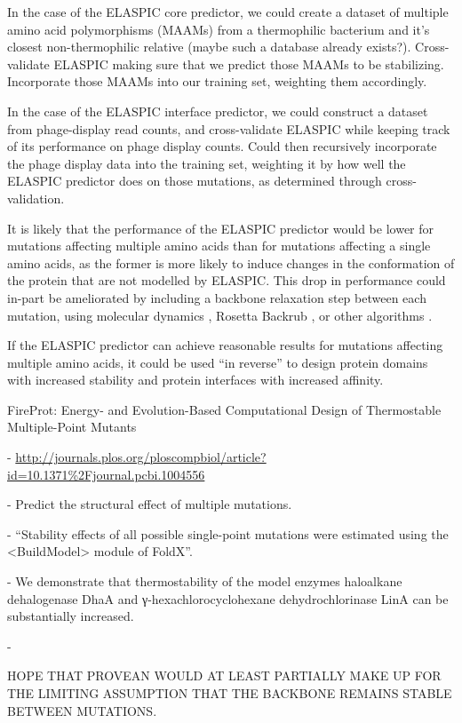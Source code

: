 In the case of the ELASPIC core predictor, we could create a dataset of multiple amino acid polymorphisms (MAAMs) from a thermophilic bacterium and it's closest non-thermophilic relative (maybe such a database already exists?). Cross-validate ELASPIC making sure that we predict those MAAMs to be stabilizing. Incorporate those MAAMs into our training set, weighting them accordingly.

In the case of the ELASPIC interface predictor, we could construct a dataset from phage-display read counts, and cross-validate ELASPIC while keeping track of its performance on phage display counts. Could then recursively incorporate the phage display data into the training set, weighting it by how well the ELASPIC predictor does on those mutations, as determined through cross-validation.

It is likely that the performance of the ELASPIC predictor would be lower for mutations affecting multiple amino acids than for mutations affecting a single amino acids, as the former is more likely to induce changes in the conformation of the protein that are not modelled by ELASPIC. This drop in performance could in-part be ameliorated by including a backbone relaxation step between each mutation, using molecular dynamics \cite{abraham_gromacs:_2015}, Rosetta Backrub \cite{smith_predicting_2011}, or other algorithms \cite{sun_protein_2016}.

If the ELASPIC predictor can achieve reasonable results for mutations affecting multiple amino acids, it could be used ``in reverse'' to design protein domains with increased stability and protein interfaces with increased affinity.

FireProt: Energy- and Evolution-Based Computational Design of Thermostable Multiple-Point Mutants

  - \url{http://journals.plos.org/ploscompbiol/article?id=10.1371%2Fjournal.pcbi.1004556}

  - Predict the structural effect of multiple mutations.

  - ``Stability effects of all possible single-point mutations were estimated using the <BuildModel> module of FoldX''.

  - We demonstrate that thermostability of the model enzymes haloalkane dehalogenase DhaA and γ-hexachlorocyclohexane dehydrochlorinase LinA can be substantially increased.

  - \cite{bednar_fireprot:_2015}



HOPE THAT PROVEAN WOULD AT LEAST PARTIALLY MAKE UP FOR THE LIMITING ASSUMPTION THAT THE BACKBONE REMAINS STABLE BETWEEN MUTATIONS.

